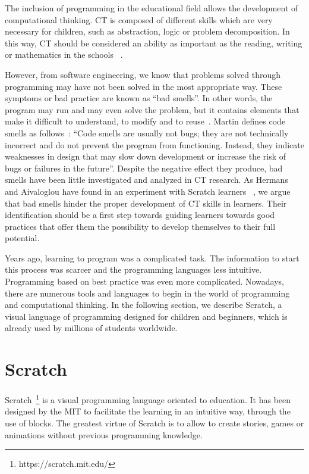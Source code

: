 The inclusion of programming in the educational field allows the development of computational thinking. CT is composed of different skills which are very necessary for children, such as abstraction, logic or problem decomposition. In this way, CT should be considered an ability as important as the reading, writing or mathematics in the schools ~\cite{calao:_design}.

However, from software engineering, we know that problems solved through programming may have not been solved in the most appropriate way. These symptoms or bad practice are known as ``bad smells''. In other words, the program may run and may even solve the problem, but it contains elements that make it difficult to understand, to modify and to reuse~\cite{zhang:_badsmells}. Martin defines code smells as follows~\cite{martin:_clean}: ``Code smells are usually not bugs; they are not technically incorrect and do not prevent the program from functioning. Instead, they indicate weaknesses in design that may slow down development or increase the risk of bugs or failures in the future''. Despite the negative effect they produce, bad smells have been little investigated and analyzed in CT research. As Hermans and Aivaloglou have found in an experiment with Scratch learners ~\cite{felienne:_hamper}, we argue that bad smells hinder the proper development of CT skills in learners. Their identification should be a first step towards guiding learners towards good practices that offer them the possibility to develop themselves to their full potential.

Years ago, learning to program was a complicated task. The information to start this process was scarcer and the programming languages less intuitive. Programming based on best practice was even more complicated. Nowadays, there are numerous tools and languages to begin in the world of programming and computational thinking. In the following section, we describe Scratch, a visual language of programming designed for children and beginners, which is already used by millions of students worldwide.


\section{Scratch}
\label{sec:scratch}

Scratch~\footnote{https://scratch.mit.edu/} is a visual programming language oriented to education. It has been designed by the MIT to facilitate the learning in an intuitive way, through the use of blocks. The greatest virtue of Scratch is to allow to create stories, games or animations without previous programming knowledge.

